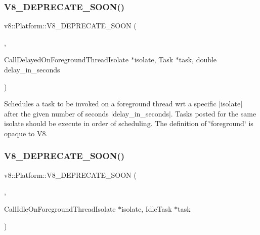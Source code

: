 \subsubsection{\texorpdfstring{V8\+\_\+\+D\+E\+P\+R\+E\+C\+A\+T\+E\+\_\+\+S\+O\+O\+N()}{V8\_DEPRECATE\_SOON()}\hspace{0.1cm}{\footnotesize\ttfamily [2/3]}}
{\footnotesize\ttfamily v8\+::\+Platform\+::\+V8\+\_\+\+D\+E\+P\+R\+E\+C\+A\+T\+E\+\_\+\+S\+O\+ON (\begin{DoxyParamCaption}\item[{\char`\"{}Use a taskrunner acquired by \mbox{\hyperlink{classv8_1_1Platform_af0d18c6bbefa133c5d11ec8a460d0278}{Get\+Foreground\+Task\+Runner}} instead.\char`\"{}}]{,  }\item[{virtual void }]{Call\+Delayed\+On\+Foreground\+ThreadIsolate $\ast$isolate, Task $\ast$task, double delay\+\_\+in\+\_\+seconds }\end{DoxyParamCaption})\hspace{0.3cm}{\ttfamily [pure virtual]}}

Schedules a task to be invoked on a foreground thread wrt a specific $\vert$isolate$\vert$ after the given number of seconds $\vert$delay\+\_\+in\+\_\+seconds$\vert$. Tasks posted for the same isolate should be execute in order of scheduling. The definition of \char`\"{}foreground\char`\"{} is opaque to V8. \mbox{\label{classv8_1_1Platform_a2164bf101f39010ec95e117a69a4e782}} 
\subsubsection{\texorpdfstring{V8\+\_\+\+D\+E\+P\+R\+E\+C\+A\+T\+E\+\_\+\+S\+O\+O\+N()}{V8\_DEPRECATE\_SOON()}\hspace{0.1cm}{\footnotesize\ttfamily [3/3]}}
{\footnotesize\ttfamily v8\+::\+Platform\+::\+V8\+\_\+\+D\+E\+P\+R\+E\+C\+A\+T\+E\+\_\+\+S\+O\+ON (\begin{DoxyParamCaption}\item[{\char`\"{}Use a taskrunner acquired by \mbox{\hyperlink{classv8_1_1Platform_af0d18c6bbefa133c5d11ec8a460d0278}{Get\+Foreground\+Task\+Runner}} instead.\char`\"{}}]{,  }\item[{virtual void }]{Call\+Idle\+On\+Foreground\+ThreadIsolate $\ast$isolate, Idle\+Task $\ast$task }\end{DoxyParamCaption})\hspace{0.3cm}{\ttfamily [inline]}}

